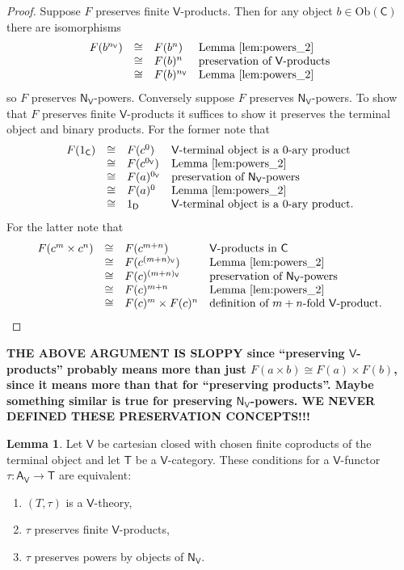 \documentclass{amsart}
\theoremstyle{definition}
\newtheorem{lemma}[theorem]{Lemma}
\newcommand{\NN}{\mathsf{N}}
\newcommand{\A}{\mathsf{A}}
\newcommand{\V}{\mathsf{V}}
\newcommand{\D}{\mathsf{D}}
\newcommand{\C}{\mathsf{C}}
\newcommand{\T}{\mathsf{T}}
\newcommand{\Obj}{\mathrm{Ob}}
\newcommand{\maps}{\colon}
\begin{document}
\begin{proof}
Suppose $F$ preserves finite $\V$-products.  Then for any object $b \in \Obj(\C)$
there are isomorphisms
\[\begin{array}{rcll}
F(b^{n_\V}) & \cong & F(b^n) & \text{Lemma \ref{lem:powers_2}} \\
 & \cong & F(b)^n & \text{preservation of $\V$-products} \\
 & \cong & F(b)^{n_\V} &  \text{Lemma \ref{lem:powers_2}}
\end{array}
\]
so $F$ preserves  $\NN_\V$-powers.  Conversely suppose $F$ preserves $\NN_\V$-powers.
To show that $F$ preserves finite $\V$-products it suffices to show it preserves
the terminal object and binary products.   For the former note that
\[\begin{array}{rcll}
F(1_\C) & \cong & F(c^0) & \text{$\V$-terminal object is a 0-ary product} \\
 & \cong & F(c^{0_\V}) & \text{Lemma \ref{lem:powers_2}} \\
 & \cong & F(a)^{0_\V} & \text{preservation of $\NN_\V$-powers} \\
 & \cong & F(a)^0 &  \text{Lemma \ref{lem:powers_2}} \\
 & \cong & 1_\D & \text{$\V$-terminal object is a 0-ary product.}
\end{array}
\]
For the latter note that
\[\begin{array}{rcll}
F(c^m \times c^n) & \cong & F(c^{m+n}) & \text{$\V$-products in $\C$} \\
 & \cong & F(c^{(m+n)_\V}) & \text{Lemma \ref{lem:powers_2}} \\
 & \cong & F(c)^{(m+n)_\V} & \text{preservation of $\NN_\V$-powers} \\
 & \cong & F(c)^{m+n} &  \text{Lemma \ref{lem:powers_2}} \\
 & \cong & F(c)^m \times F(c)^n & \text{definition of $m+n$-fold $\V$-product.}
\end{array}  
\]
\end{proof}

\noindent
\textbf{THE ABOVE ARGUMENT IS SLOPPY since ``preserving $\V$-products'' probably means more than just $F(a \times b) \cong F(a) \times F(b)$, since it means more than that for ``preserving products''.  Maybe something similar is true for preserving $\NN_\V$-powers.  WE NEVER DEFINED THESE PRESERVATION CONCEPTS!!!}

\begin{lemma}
\label{lem:powers_4}
Let $\V$ be cartesian closed with chosen finite coproducts of the terminal object and let
$\T$ be a $\V$-category.  These conditions for a $\V$-functor $\tau \maps \A_\V \to \T$ are equivalent:
\begin{enumerate}
\item $(T,\tau)$ is a $\V$-theory,
\item $\tau$ preserves finite $\V$-products,
\item $\tau$ preserves powers by objects of $\NN_\V$.
\end{enumerate}
\end{lemma}
\end{document}
